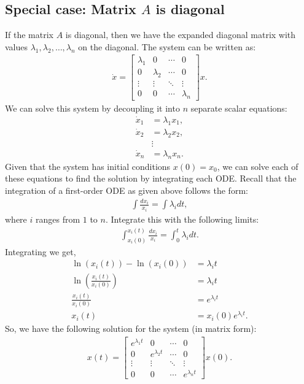 \documentclass{ee122_notes}
\begin{document}
\subsection{Special case: Matrix $A$ is diagonal}
If the matrix $A$ is diagonal, then we have the expanded diagonal matrix with values $\lambda_1, \lambda_2, \ldots, \lambda_n$ on the diagonal. The system can be written as:
\begin{align*}
    \dot{x} = \begin{bmatrix}
        \lambda_1 & 0 & \cdots & 0 \\
        0 & \lambda_2 & \cdots & 0 \\
        \vdots & \vdots & \ddots & \vdots \\
        0 & 0 & \cdots & \lambda_n
    \end{bmatrix} x.
\end{align*}
We can solve this system by decoupling it into $n$ separate scalar equations:
\begin{align*}
    \dot{x}_1 &= \lambda_1 x_1, \\
    \dot{x}_2 &= \lambda_2 x_2, \\
    &\vdots \\
    \dot{x}_n &= \lambda_n x_n.
\end{align*}
Given that the system has initial conditions $x(0) = x_0$, we can solve each of these equations to find the solution by integrating each ODE. Recall that the integration of a first-order ODE as given above follows the form:
\begin{align*}
    \int \frac{dx_i}{x_i} = \int \lambda_i dt,
\end{align*}
where $i$ ranges from $1$ to $n$. Integrate this with the following limits:
\begin{align*}
    \int_{x_i(0)}^{x_i(t)} \frac{dx_i}{x_i} = \int_0^t \lambda_i dt.
\end{align*}
Integrating we get,
\begin{align*}
    \ln(x_i(t)) - \ln(x_i(0)) &= \lambda_i t\\
    \ln\left(\frac{x_i(t)}{x_i(0)}\right) &= \lambda_i t\\
    \frac{x_i(t)}{x_i(0)} &= e^{\lambda_i t}\\
    x_i(t) &= x_i(0) e^{\lambda_i t}.
\end{align*}
So, we have the following solution for the system (in matrix form):
\begin{align*}
    x(t) = \begin{bmatrix}
        e^{\lambda_1 t} & 0 & \cdots & 0 \\
        0 & e^{\lambda_2 t} & \cdots & 0 \\
        \vdots & \vdots & \ddots & \vdots \\
        0 & 0 & \cdots & e^{\lambda_n t}
    \end{bmatrix} x(0).
\end{align*}
\end{document}
